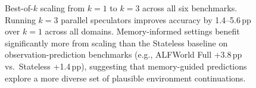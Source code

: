\begin{figure}[t]
\caption{Best-of-$k$ scaling from $k=1$ to $k=3$ across all six benchmarks. Running $k=3$ parallel speculators improves accuracy by 1.4--5.6\,pp over $k=1$ across all domains. Memory-informed settings benefit significantly more from scaling than the Stateless baseline on observation-prediction benchmarks (e.g., ALFWorld Full +3.8\,pp vs.\ Stateless +1.4\,pp), suggesting that memory-guided predictions explore a more diverse set of plausible environment continuations.}
\label{fig:bestofk_scaling}
\end{figure}